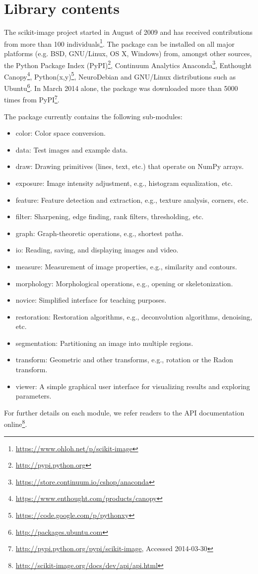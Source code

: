 
\section*{Library contents}
  \label{library-contents}

  The scikit-image project started in August of 2009 and has received contributions from more than 100 individuals\footnote{\url{https://www.ohloh.net/p/scikit-image}}.  The package can be installed on all major platforms (e.g. BSD, GNU/Linux, OS X, Windows) from, amongst other sources, the Python Package Index (PyPI)\footnote{\url{http://pypi.python.org}}, Continuum Analytics Anaconda\footnote{\url{https://store.continuum.io/cshop/anaconda}}, Enthought Canopy\footnote{\url{https://www.enthought.com/products/canopy}}, Python(x,y)\footnote{\url{https://code.google.com/p/pythonxy}}, NeuroDebian \citep{neurodebian} and GNU/Linux distributions such as Ubuntu\footnote{\url{http://packages.ubuntu.com}}. In March 2014 alone, the package was downloaded more than 5000 times from PyPI\footnote{\url{http://pypi.python.org/pypi/scikit-image}, Accessed 2014-03-30}.

  The package currently contains the following sub-modules:

  \begin{itemize}

    \item color: Color space conversion.
    \item data: Test images and example data.
    \item draw: Drawing primitives (lines, text, etc.) that operate on NumPy arrays.
    \item exposure: Image intensity adjustment, e.g., histogram equalization, etc.
    \item feature: Feature detection and extraction, e.g., texture analysis, corners, etc.
    \item filter: Sharpening, edge finding, rank filters, thresholding, etc.
    \item graph: Graph-theoretic operations, e.g., shortest paths.
    \item io: Reading, saving, and displaying images and video.
    \item measure: Measurement of image properties, e.g., similarity and contours.
    \item morphology: Morphological operations, e.g., opening or skeletonization.
    \item novice: Simplified interface for teaching purposes.
    \item restoration: Restoration algorithms, e.g., deconvolution algorithms, denoising, etc.
    \item segmentation: Partitioning an image into multiple regions.
    \item transform: Geometric and other transforms, e.g., rotation or the Radon transform.
    \item viewer: A simple graphical user interface for visualizing results and exploring parameters.

  \end{itemize}

  For further details on each module, we refer readers to the API documentation
  online\footnote{\url{http://scikit-image.org/docs/dev/api/api.html}}.
